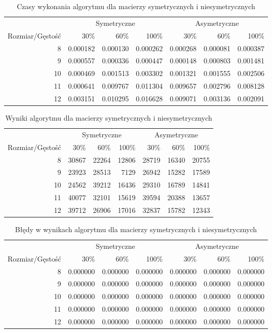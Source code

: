 \begin{table}[ht]
\centering
\begin{tabular}{rrrrrrr}
\toprule
 & \multicolumn{3}{c}{Symetryczne} & \multicolumn{3}{c}{Asymetryczne} \\
Rozmiar/Gęstość & 30\% & 60\% & 100\% & 30\% & 60\% & 100\% \\
\midrule
8 & 0.000182 & 0.000130 & 0.000262 & 0.000268 & 0.000081 & 0.000387 \\
9 & 0.000557 & 0.000336 & 0.000447 & 0.000148 & 0.000803 & 0.001481 \\
10 & 0.000469 & 0.001513 & 0.003302 & 0.001321 & 0.001555 & 0.002506 \\
11 & 0.000641 & 0.009767 & 0.011304 & 0.009657 & 0.002796 & 0.008128 \\
12 & 0.003151 & 0.010295 & 0.016628 & 0.009071 & 0.003136 & 0.002091 \\
\bottomrule
\end{tabular}
\caption{Czasy wykonania algorytmu dla macierzy symetrycznych i niesymetrycznych}
\label{tab:mean_time_leastCostresoult}
\end{table}
\begin{table}[ht]
\centering
\begin{tabular}{rrrrrrr}
\toprule
 & \multicolumn{3}{c}{Symetryczne} & \multicolumn{3}{c}{Asymetryczne} \\
Rozmiar/Gęstość & 30\% & 60\% & 100\% & 30\% & 60\% & 100\% \\
\midrule
8 & 30867 & 22264 & 12806 & 28719 & 16340 & 20755 \\
9 & 23923 & 28513 & 7129 & 26942 & 15282 & 17589 \\
10 & 24562 & 39212 & 16436 & 29310 & 16789 & 14841 \\
11 & 40077 & 32101 & 15619 & 39594 & 20388 & 13657 \\
12 & 39712 & 26906 & 17016 & 32837 & 15782 & 12343 \\
\bottomrule
\end{tabular}
\caption{Wyniki algorytmu dla macierzy symetrycznych i niesymetrycznych}
\label{tab:resoult_leastCostresoult}
\end{table}
\begin{table}[ht]
\centering
\begin{tabular}{rrrrrrr}
\toprule
 & \multicolumn{3}{c}{Symetryczne} & \multicolumn{3}{c}{Asymetryczne} \\
Rozmiar/Gęstość & 30\% & 60\% & 100\% & 30\% & 60\% & 100\% \\
\midrule
8 & 0.000000 & 0.000000 & 0.000000 & 0.000000 & 0.000000 & 0.000000 \\
9 & 0.000000 & 0.000000 & 0.000000 & 0.000000 & 0.000000 & 0.000000 \\
10 & 0.000000 & 0.000000 & 0.000000 & 0.000000 & 0.000000 & 0.000000 \\
11 & 0.000000 & 0.000000 & 0.000000 & 0.000000 & 0.000000 & 0.000000 \\
12 & 0.000000 & 0.000000 & 0.000000 & 0.000000 & 0.000000 & 0.000000 \\
\bottomrule
\end{tabular}
\caption{Błędy w wynikach algorytmu dla macierzy symetrycznych i niesymetrycznych}
\label{tab:error_leastCostresoult}
\end{table}
